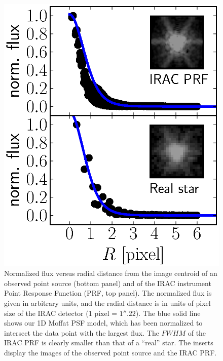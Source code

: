 \documentclass[preprint2]{emulateapj}
\begin{document}
\begin{figure}[h]
\begin{center}
\includegraphics[width=1\columnwidth, trim = 220 30 20 20, clip=True]{images/psf.eps}
\caption{Normalized flux versus radial distance 
from the image centroid of an observed point source (bottom panel) 
and of the IRAC instrument Point Response Function (PRF, top panel). 
The normalized flux is given in arbitrary units, 
and the radial distance is in units of pixel size of the IRAC detector (1 pixel = $1''.22$).
The blue solid line shows our 1D Moffat PSF model,
which has been normalized to intersect the data point with the largest flux. 
The $FWHM$ of the IRAC PRF is clearly smaller than that of a ``real'' star.
The inserts display the images of the observed point source and the IRAC PRF.}
\label{fig:psf}
\end{center}
\end{figure}
\end{document}
